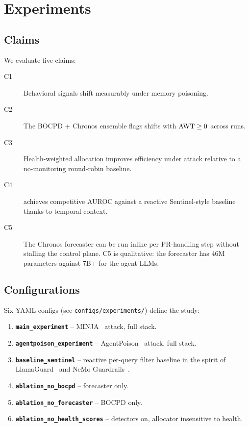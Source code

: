 \section{Experiments}
\label{sec:experiments}

\subsection{Claims}
\label{sec:experiments:claims}

We evaluate five claims:
\begin{description}
  \item[C1] Behavioral signals shift measurably under memory poisoning.
  \item[C2] The BOCPD + Chronos ensemble flags shifts with
  $\text{AWT}{} \geq 0$ across runs.
  \item[C3] Health-weighted allocation improves efficiency under
  attack relative to a no-monitoring round-robin baseline.
  \item[C4] \sys{} achieves competitive AUROC against a reactive
  Sentinel-style baseline thanks to temporal context.
  \item[C5] The Chronos forecaster can be run inline per PR-handling
  step without stalling the control plane. C5 is qualitative: the
  forecaster has 46M parameters against 7B+ for the agent LLMs.
\end{description}

\subsection{Configurations}
\label{sec:experiments:configs}

Six YAML configs (see \texttt{configs/experiments/}) define the study:
\begin{enumerate}
  \item \textbf{\texttt{main\_experiment}} -- MINJA~\citep{minja}
  attack, full \sys{} stack.
  \item \textbf{\texttt{agentpoison\_experiment}} --
  AgentPoison~\citep{agentpoison} attack, full stack.
  \item \textbf{\texttt{baseline\_sentinel}} -- reactive per-query
  filter baseline in the spirit of
  LlamaGuard~\citep{llamaguard} and NeMo
  Guardrails~\citep{nemoguardrails}.
  \item \textbf{\texttt{ablation\_no\_bocpd}} -- forecaster only.
  \item \textbf{\texttt{ablation\_no\_forecaster}} -- BOCPD only.
  \item \textbf{\texttt{ablation\_no\_health\_scores}} -- detectors
  on, allocator insensitive to health.
\end{enumerate}

